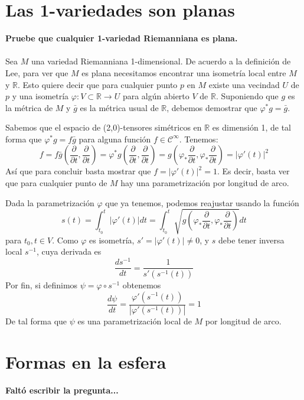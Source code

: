\documentclass[11pt]{article}
\begin{document}
	\section*{Las 1-variedades son planas}
	\textbf{Pruebe que cualquier 1-variedad Riemanniana es plana.}\\\leavevmode\\
	Sea $M$ una variedad Riemanniana 1-dimensional. 
	De acuerdo a la definición de Lee, para ver que $M$ es plana necesitamos encontrar una isometría local entre $M$ y $\mathbb{R}$. Esto quiere decir que para cualquier punto $p$ en $M$ existe una vecindad $U$ de $p$ y una isometría $\varphi:V\subset\mathbb{R}\longrightarrow U$ para algún abierto $V$ de $\mathbb{R}$. Suponiendo que $g$ es la métrica de $M$ y $\bar{g}$ es la métrica usual de $\mathbb{R}$, debemos demostrar que $\varphi^*g=\bar{g}$.\par
	Sabemos que el espacio de (2,0)-tensores simétricos en $\mathbb{R}$ es dimensión 1, de tal forma que $\varphi^*g=f\bar{g}$ para alguna función $f\in\mathcal{C}^\infty$. Tenemos:
	$$f=f\bar{g}(\frac{\partial}{\partial t},\frac{\partial}{\partial t})=\varphi^*g(\frac{\partial}{\partial t},\frac{\partial}{\partial t})=g(\varphi_*\frac{\partial}{\partial t},\varphi_*\frac{\partial}{\partial t})=|\varphi'(t)|^2$$
	Así que para concluir basta mostrar que $f=|\varphi'(t)|^2=1$. Es decir, basta ver que para cualquier punto de $M$ hay una parametrización por longitud de arco.\par
	Dada la parametrización $\varphi$ que ya tenemos, podemos reajustar usando la función
	$$s(t)=\int_{t_0}^t|\varphi'(t)|dt=\int_{t_0}^t\sqrt{g(\varphi_*\frac{\partial}{\partial t},\varphi_*\frac{\partial}{\partial t})}dt$$
	para $t_0,t\in V$. Como $\varphi$ es isometría, $s'=|\varphi'(t)|\neq 0$, y $s$ debe tener inversa local $s^{-1}$, cuya derivada es
	$$\frac{ds^{-1}}{dt}=\frac{1}{s'(s^{-1}(t))}$$
	Por fin, si definimos $\psi=\varphi\circ s^{-1}$ obtenemos
	$$\frac{d\psi}{dt}=\frac{\varphi'(s^{-1}(t))}{|\varphi'(s^{-1}(t))|}=1$$
	De tal forma que $\psi$ es una parametrización local de $M$ por longitud de arco.
	\newpage
	\section{Formas en la esfera}
	\textbf{Falt\'o escribir la pregunta...}
	
\end{document}
